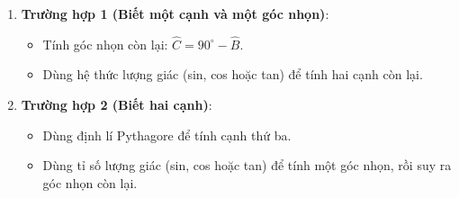 \begin{enumerate}
\item \textbf{Trường hợp 1 (Biết một cạnh và một góc nhọn)}:
\begin{itemize}
\item Tính góc nhọn còn lại: $\widehat{C} = 90^\circ - \widehat{B}$.
\item Dùng hệ thức lượng giác (sin, cos hoặc tan) để tính hai cạnh còn lại.
\end{itemize}
\item \textbf{Trường hợp 2 (Biết hai cạnh)}:
\begin{itemize}
\item Dùng định lí Pythagore để tính cạnh thứ ba.
\item Dùng tỉ số lượng giác (sin, cos hoặc tan) để tính một góc nhọn, rồi suy ra góc nhọn còn lại.
\end{itemize}
\end{enumerate}
